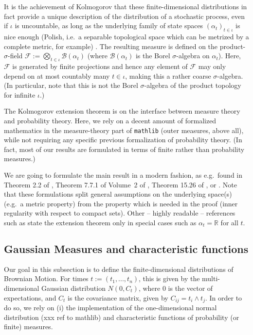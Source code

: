\documentclass[lean]{AFM}
\begin{document}
It is the achievement of Kolmogorov that these finite-dimensional distributions in fact provide a unique description of the distribution of a stochastic process, even if $\iota$ is uncountable, as long as the underlying family of state spaces $(\alpha_t)_{t\in\iota}$ is nice enough (Polish, i.e.\ a separable topological space which can be metrized by a complete metric, for example) \cite{kolmogoroff1933grundbegriffe}.
The resulting measure is defined on the product-$\sigma$-field $\mathcal F :=\bigotimes_{t\in\iota} \mathcal B(\alpha_t)$ (where $\mathcal B(\alpha_t)$ is the Borel $\sigma$-algebra on $\alpha_t$). Here, $\mathcal F$ is generated by finite projections and hence any element of $\mathcal F$ may only depend on at most countably many $t\in \iota$, making this a rather coarse $\sigma$-algebra. (In particular, note that this is not the Borel $\sigma$-algebra of the product topology for infinite $\iota$.)

The Kolmogorov extension theorem is on the interface between measure theory and probability theory. Here, we rely on a decent amount of formalized mathematics in the measure-theory part of {\tt mathlib} (outer measures, above all), while not requiring any specific previous formalization of probability theory. (In fact, most of our results are formulated in terms of finite rather than probability measures.)

We are going to formulate the main result in a modern fashion, as e.g.\ found in Theorem 2.2 of \cite{rao1971projective}, Theorem 7.7.1 of Volume~2 of \cite{bogachev2007measure}, Theorem 15.26 of \cite{guide2006infinite}, or \cite{border1998expository}. Note that these formulations split general assumptions on the underlying space(s) (e.g.\ a metric property) from the property which is needed in the proof (inner regularity with respect to compact sets). Other -- highly readable -- references such as \cite{Billingsley1995} state the extension theorem only in special cases such as $\alpha_t = \mathbb R$ for all $t$.


\subsection{Gaussian Measures and characteristic functions}
\label{ss:char}
Our goal in this subsection is to define the finite-dimensional distributions of Brownian Motion. For times $t := (t_1, ..., t_n)$, this is given by the multi-dimensional Gaussian distribution $N(0, C_t)$, where $0$ is the vector of expectations, and $C_t$ is the covariance matrix, given by $C_{ij} = t_i \wedge t_j$. In order to do so, we rely on (i) the implementation of the one-dimensional normal distribution (xxx ref to mathlib) and characteristic functions of probability (or finite) measures.
\end{document}
